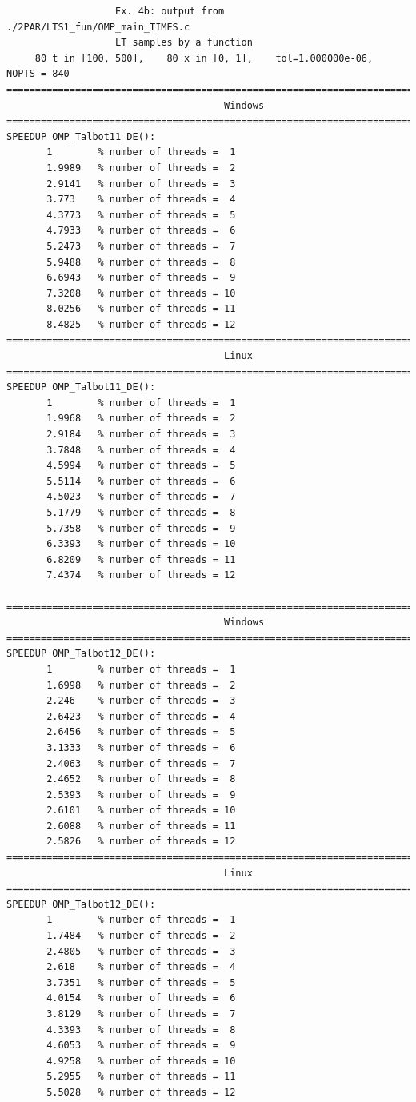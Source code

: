 \documentclass[a4paper,10pt]{report}%
\begin{document}
\begin{lstlisting}
                   Ex. 4b: output from ./2PAR/LTS1_fun/OMP_main_TIMES.c
                   LT samples by a function
     80 t in [100, 500],    80 x in [0, 1],    tol=1.000000e-06,    NOPTS = 840
====================================================================================
                                      Windows
====================================================================================
SPEEDUP OMP_Talbot11_DE():
       1        % number of threads =  1
       1.9989   % number of threads =  2
       2.9141   % number of threads =  3
       3.773    % number of threads =  4
       4.3773   % number of threads =  5
       4.7933   % number of threads =  6
       5.2473   % number of threads =  7
       5.9488   % number of threads =  8
       6.6943   % number of threads =  9
       7.3208   % number of threads = 10
       8.0256   % number of threads = 11
       8.4825   % number of threads = 12
====================================================================================
                                      Linux
====================================================================================
SPEEDUP OMP_Talbot11_DE():
       1        % number of threads =  1
       1.9968   % number of threads =  2
       2.9184   % number of threads =  3
       3.7848   % number of threads =  4
       4.5994   % number of threads =  5
       5.5114   % number of threads =  6
       4.5023   % number of threads =  7
       5.1779   % number of threads =  8
       5.7358   % number of threads =  9
       6.3393   % number of threads = 10
       6.8209   % number of threads = 11
       7.4374   % number of threads = 12

====================================================================================
                                      Windows
====================================================================================
SPEEDUP OMP_Talbot12_DE():
       1        % number of threads =  1
       1.6998   % number of threads =  2
       2.246    % number of threads =  3
       2.6423   % number of threads =  4
       2.6456   % number of threads =  5
       3.1333   % number of threads =  6
       2.4063   % number of threads =  7
       2.4652   % number of threads =  8
       2.5393   % number of threads =  9
       2.6101   % number of threads = 10
       2.6088   % number of threads = 11
       2.5826   % number of threads = 12
====================================================================================
                                      Linux
====================================================================================
SPEEDUP OMP_Talbot12_DE():
       1        % number of threads =  1
       1.7484   % number of threads =  2
       2.4805   % number of threads =  3
       2.618    % number of threads =  4
       3.7351   % number of threads =  5
       4.0154   % number of threads =  6
       3.8129   % number of threads =  7
       4.3393   % number of threads =  8
       4.6053   % number of threads =  9
       4.9258   % number of threads = 10
       5.2955   % number of threads = 11
       5.5028   % number of threads = 12


\end{lstlisting}
\end{document}
